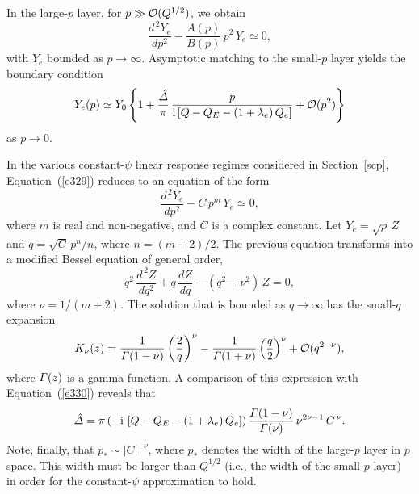 \documentclass[notitlepage,12pt]{article}
\begin{document}
In the large-$p$ layer, for  $p\gg {\cal O}(Q^{1/2})$, we obtain 
\begin{equation}\label{e329}
\frac{d^{\,2} Y_e}{dp^2} - \frac{A(p)}{B(p)}\,p^2\,Y_e\simeq 0,
\end{equation}
with $Y_e$ bounded as $p\rightarrow \infty$. Asymptotic matching to the small-$p$ layer yields the boundary
condition 
\begin{equation}\label{e330}
Y_e(p)\simeq Y_0\left\{1+ \frac{\hat{\mit\Delta}}{\pi}\,\frac{p}{{\rm i}\,[Q-Q_E-(1+\lambda_e)\,Q_e]}+ {\cal O}(p^2)\right\}
\end{equation}
as $p\rightarrow 0$. 

In the various constant-$\psi$ linear response regimes considered in Section~\ref{scp}, Equation~(\ref{e329}) reduces to an
equation of the form
\begin{equation}\label{e330a}
\frac{d^{\,2}Y_e}{dp^2}- C\,p^m\,Y_e\simeq 0,
\end{equation}
where $m$ is real and non-negative, and $C$ is a complex constant. Let $Y_e=\sqrt{p}\,Z$ and $q=\sqrt{C}\,p^n/n$, where
$n=(m+2)/2$. The previous equation transforms into a modified Bessel equation of general order, 
\begin{equation}
q^2\,\frac{d^{\,2}Z}{dq^2} + q\,\frac{dZ}{dq} - (q^2+\nu^2)\,Z =0,
\end{equation}
where $\nu=1/(m+2)$. The solution that is bounded as $q\rightarrow \infty$ has the small-$q$
expansion
\begin{equation}\label{e332}
K_\nu(z)= \frac{1}{{\mit\Gamma}(1-\nu)}\left(\frac{2}{q}\right)^\nu - \frac{1}{{\mit\Gamma}(1+\nu)}\left(\frac{q}{2}\right)^\nu + {\cal O}(q^{2-\nu}),
\end{equation}
where ${\mit\Gamma}(z)$ is a gamma function. 
A comparison of this expression with Equation~(\ref{e330}) reveals that
\begin{equation}
\hat{\mit\Delta} = \pi\,(-{\rm i}\,\left[Q-Q_E-(1+\lambda_e)\,Q_e\right])\, \frac{{\mit\Gamma}(1-\nu)}{{\mit\Gamma}(\nu)}\,\nu^{2\nu-1}\,C^{\,\nu}.
\end{equation}
Note, finally, that $p_\ast\sim |C|^{-\nu}$, where $p_\ast$ denotes the width of the large-$p$ layer in $p$ space. This width must be larger than $Q^{1/2}$ (i.e., the width of the small-$p$ layer) in order for the constant-$\psi$ approximation to hold. 
\end{document}
